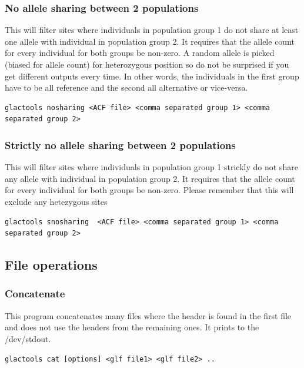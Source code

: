 \documentclass[a4paper]{article}
\begin{document}
\subsubsection{No allele sharing between 2 populations}

\noindent This will filter sites where individuals in population group 1 do not share at least one allele with individual in population group 2.
It requires that the allele count for every individual for both groups be non-zero.
A random allele is picked (biased for allele count) for heterozygous position so do not be surprised if you get different outputs every time.
In other words, the individuals in the first group have to be all reference and the second all alternative or vice-versa.

\tiny
\begin{lstlisting}
glactools nosharing <ACF file> <comma separated group 1> <comma separated group 2>
\end{lstlisting}
\normalsize

\subsubsection{Strictly no allele sharing between 2 populations}
\noindent This will filter sites where individuals in population group 1 strickly do not share any allele with individual in population group 2.
It requires that the allele count for every individual for both groups be non-zero.
Please remember that this will exclude any hetezygous sites

\small
\begin{lstlisting}
glactools snosharing  <ACF file> <comma separated group 1> <comma separated group 2>
\end{lstlisting}
\normalsize



\subsection{File operations}

\subsubsection{Concatenate}
\noindent This program concatenates many files where the header is found in the first file and does not use the headers from the remaining ones. It prints to the /dev/stdout.

\begin{lstlisting}
glactools cat [options] <glf file1> <glf file2> .. 
\end{lstlisting}
\end{document}
